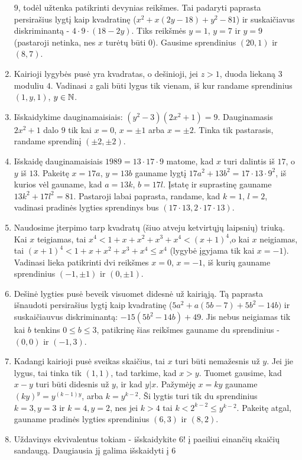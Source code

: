 \begin{enumerate}
$9$, todėl užtenka patikrinti devynias reikšmes. Tai padaryti paprasta
persirašius lygtį kaip kvadratinę ($x^2 + x(2y-18) + y^2 - 81$) ir
suskaičiavus diskriminantą - $4\cdot 9\cdot (18-2y)$. Tiks reikšmės
$y=1$, $y=7$ ir $y=9$ (pastaroji netinka, nes $x$ turėtų būti
$0$). Gausime sprendinius $(20,1)$ ir $(8,7)$. 
\item 
Kairioji lygybės pusė yra kvadratas, o dešinioji, jei $z>1$, duoda
liekaną $3$ moduliu $4$. Vadinasi $z$ gali būti lygus tik vienam, iš
kur randame sprendinius $(1,y,1)$, $y \in \mathbb N$.
\item 
Išskaidykime dauginamaisiais: $(y^2 - 3)(2x^2 + 1)=9$. Dauginamasis
$2x^2 + 1$ dalo $9$ tik kai $x=0$, $x=\pm 1$ arba $x=\pm 2$. Tinka tik
pastarasis, randame sprendinį $(\pm 2, \pm 2)$.
\item 
Išskaidę dauginamaisiais $1989 = 13\cdot17\cdot9$ matome, kad $x$ turi
dalintis iš $17$, o $y$ iš $13$. Pakeitę $x=17a$, $y=13b$ gauname
lygtį $17a^2 + 13b^2 = 17\cdot13\cdot 9^2$, iš kurios vėl gauname, kad
$a=13k$, $b=17l$. Įstatę ir suprastinę gauname $13k^2 + 17l^2 = 81$.
Pastaroji labai paprasta, randame, kad $k=1$, $l=2$, vadinasi pradinės
lygties sprendinys bus $(17\cdot13, 2\cdot 17\cdot 13)$.
\item 
Naudosime įterpimo tarp kvadratų (šiuo atveju ketvirtųjų laipsnių)
triuką. Kai $x$ teigiamas, tai $x^4<1+x+x^2+x^3+x^4<(x+1)^4$,o kai
$x$ neigiamas, tai $(x+1)^4<1+x+x^2+x^3+x^4\leq x^4$ (lygybė įgyjama
tik kai $x=-1$). Vadinasi lieka patikrinti dvi reikšmes $x=0$,
$x=-1$, iš kurių gauname sprendinius $(-1, \pm 1)$ ir $(0, \pm 1)$.
\item 
Dešinė lygties pusė beveik visuomet didesnė už kairiąją. Tą paprasta
išnaudoti persirašius lygtį kaip kvadratinę ($5a^2 + a(5b-7)
+5b^2-14b)$ ir suskaičiauvus diskriminantą: $-15(5b^2-14b) +49.$ Jis
nebus neigiamas tik kai $b$ tenkins $0\leq b \leq 3$, patikrinę šias
reikšmes gauname du sprendinius - $(0,0)$ ir $(-1, 3)$.
\item 
Kadangi kairioji pusė sveikas skaičius, tai $x$ turi būti nemažesnis
už $y$. Jei jie lygus, tai tinka tik $(1,1)$, tad tarkime, kad
$x>y$. Tuomet gausime, kad $x-y$ turi būti didesnis už $y$, ir kad
$y|x$. Pažymėję $x=ky$ gauname $(ky)^{y} = y^{(k-1)y}$, arba
$k = y^{k-2}$. Ši lygtis turi tik du sprendinius $k=3,y=3$ ir
$k=4, y=2$, nes jei $k>4$ tai $k<2^{k-2}\leq y^{k-2}$. Pakeitę atgal,
gauname pradinės lygties sprendinius $(6,3)$ ir $(8,2)$.
\item 
Uždavinys ekvivalentus tokiam - išskaidykite $6!$ į paeiliui einančių
skaičių sandaugą. Daugiausia jį galima išskaidyti į $6$

\end{enumerate}
